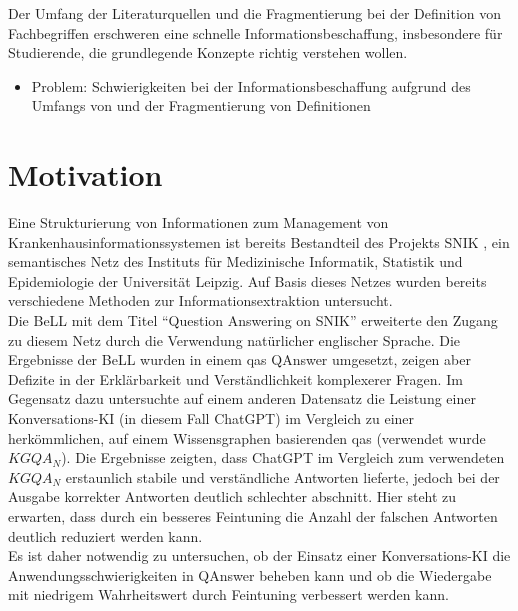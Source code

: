Der Umfang der Literaturquellen und die Fragmentierung bei der Definition von Fachbegriffen
erschweren eine schnelle Informationsbeschaffung, insbesondere für Studierende, die grundlegende Konzepte richtig verstehen wollen.\\

\begin{itemize}
  \item Problem: Schwierigkeiten bei der Informationsbeschaffung aufgrund des Umfangs von \citet{bb} und der Fragmentierung von Definitionen
\end{itemize}

\section{Motivation}

Eine Strukturierung von Informationen zum Management von Krankenhausinformationssystemen ist bereits Bestandteil des Projekts SNIK \citep{semantischesnetz, domaene},
ein semantisches Netz des Instituts für Medizinische Informatik, Statistik und Epidemiologie der Universität Leipzig.
Auf Basis dieses Netzes wurden bereits verschiedene Methoden zur Informationsextraktion untersucht.\\
Die BeLL mit dem Titel \enquote{Question Answering on SNIK} \citep{hannesbell} erweiterte den Zugang zu diesem Netz durch die Verwendung natürlicher englischer Sprache.
Die Ergebnisse der BeLL wurden in einem \ac{qas} QAnswer \citep{qanswer} umgesetzt, zeigen aber Defizite in der Erklärbarkeit und Verständlichkeit komplexerer Fragen.
Im Gegensatz dazu untersuchte \citet{chatgpt_qas} auf einem anderen Datensatz die Leistung einer Konversations-KI (in diesem Fall ChatGPT) im Vergleich zu einer herkömmlichen, auf einem Wissensgraphen basierenden \ac{qas} (verwendet wurde $KGQA_N$).
Die Ergebnisse zeigten, dass ChatGPT im Vergleich zum verwendeten $KGQA_N$ erstaunlich stabile und verständliche Antworten lieferte, jedoch bei der Ausgabe korrekter Antworten deutlich schlechter abschnitt. Hier steht zu erwarten, dass durch ein besseres Feintuning die Anzahl der falschen Antworten deutlich reduziert werden kann.\\

Es ist daher notwendig zu untersuchen, ob der Einsatz einer Konversations-KI die Anwendungsschwierigkeiten in QAnswer beheben kann und ob die Wiedergabe mit niedrigem Wahrheitswert durch Feintuning verbessert werden kann.

